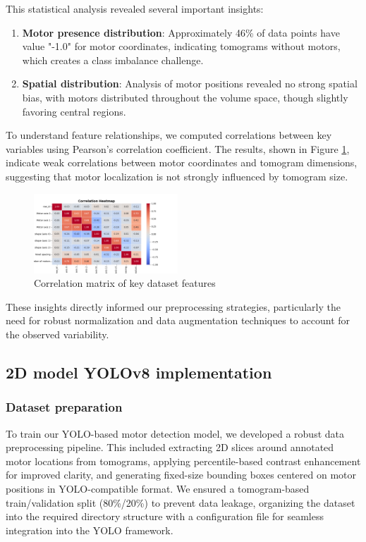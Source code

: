 \documentclass{article}
\begin{document}
This statistical analysis revealed several important insights:

\begin{enumerate}
    \item \textbf{Motor presence distribution}: Approximately 46\% of data points have value "-1.0" for motor coordinates, indicating tomograms without motors, which creates a class imbalance challenge.    
    \item \textbf{Spatial distribution}: Analysis of motor positions revealed no strong spatial bias, with motors distributed throughout the volume space, though slightly favoring central regions.
\end{enumerate}

To understand feature relationships, we computed correlations between key variables using Pearson's correlation coefficient. The results, shown in Figure \ref{Fig:correlation_matrix}, indicate weak correlations between motor coordinates and tomogram dimensions, suggesting that motor localization is not strongly influenced by tomogram size.

\begin{figure}[htb]
    \centering
    \includegraphics[width=0.48\textwidth]{images/correlation_heatmap.png}
    \caption{Correlation matrix of key dataset features}
    \label{Fig:correlation_matrix}
\end{figure}


These insights directly informed our preprocessing strategies, particularly the need for robust normalization and data augmentation techniques to account for the observed variability.

\subsection{2D model YOLOv8 implementation}

\subsubsection{Dataset preparation}
To train our YOLO-based motor detection model, we developed a robust data preprocessing pipeline. This included extracting 2D slices around annotated motor locations from tomograms, applying percentile-based contrast enhancement for improved clarity, and generating fixed-size bounding boxes centered on motor positions in YOLO-compatible format. We ensured a tomogram-based train/validation split (80\%/20\%) to prevent data leakage, organizing the dataset into the required directory structure with a configuration file for seamless integration into the YOLO framework.
\end{document}
